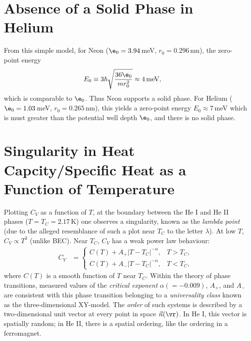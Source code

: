 \documentclass[qo.tex]{subfiles}
\begin{document}
\section{Absence of a Solid Phase in Helium}
From this simple model, for Neon ($\e_0=3.94\,$meV, $r_0=0.296\,$nm), the zero-point energy 
\begin{align}
    E_0 &\equiv 3\hbar\sqrt{\frac{36\e_0}{mr_0^2}}\approx 4\,\text{meV},
\end{align}
which is comparable to $\e_0$.
Thus Neon supports a solid phase. 
For Helium ($\e_0=1.03\,$meV, $r_0=0.265\,$nm), this yields a zero-point energy $E_0\approx7\,$meV which is must greater than the potential well depth $\e_0$, and there is no solid phase. 

\section{Singularity in Heat Capcity/Specific Heat as a Function of Temperature}
Plotting $C_V$ as a function of $T$, at the boundary between the He I and He II phases ($T=T_C=2.17\,$K) one observes a singularity, known as the \emph{lambda point} (due to the alleged resemblance of such a plot near $T_C$ to the letter $\lambda$).
At low $T$, $C_V\propto T^3$ (unlike BEC).
Near $T_C$, $C_V$ has a weak power law behaviour:
\begin{align}
    C_V &= \begin{cases} C(T) + A_+|T-T_C|^{-\alpha}, & T > T_C, \\ C(T) + A_-|T-T_C|^{-\alpha}, & T < T_C,\end{cases}
\end{align}
where $C(T)$ is a smooth function of $T$ near $T_C$.
Within the theory of phase transitions, measured values of the \emph{critical exponent} $\alpha(=-0.009)$, $A_+$, and $A_-$ are consistent with this phase transition belonging to a \emph{universality class} known as the three-dimensional XY-model. 
The \emph{order} of such systems is described by a two-dimensional unit vector at every point in space $\vec{n}(\vr)$.
In He I, this vector is spatially random; in He II, there is a spatial ordering, like the ordering in a ferromagnet. 
\end{document}
